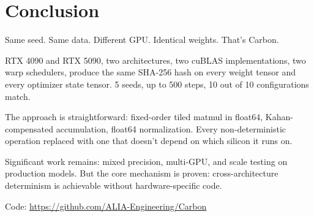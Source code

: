 \documentclass[11pt,a4paper]{article}
\begin{document}
\section{Conclusion}

Same seed. Same data. Different GPU. Identical weights. That's Carbon.

RTX 4090 and RTX 5090, two architectures, two cuBLAS implementations,
two warp schedulers, produce the same SHA-256 hash on every weight tensor
and every optimizer state tensor. 5 seeds, up to 500 steps, 10 out of 10
configurations match.

The approach is straightforward: fixed-order tiled matmul in float64,
Kahan-compensated accumulation, float64 normalization. Every non-deterministic
operation replaced with one that doesn't depend on which silicon it runs on.

Significant work remains: mixed precision, multi-GPU, and scale testing
on production models. But the core mechanism is proven: cross-architecture
determinism is achievable without hardware-specific code.

Code: \url{https://github.com/ALIA-Engineering/Carbon}
\end{document}
